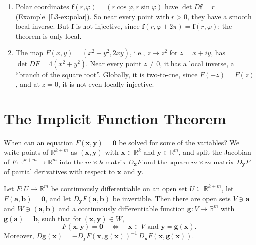 \begin{example}\label{A-ex:local-inverse}
    \begin{enumerate}
        \item Polar coordinates $\mathbf{f}(r, \varphi) = (r\cos\varphi, r\sin\varphi)$ have $\det D\mathbf{f} = r$ (Example~\ref{L3-ex:polar}). So near every point with $r > 0$, they have a smooth local inverse. But $\mathbf{f}$ is not injective, since $\mathbf{f}(r, \varphi + 2\pi) = \mathbf{f}(r, \varphi)$: the theorem is only local.
        \item The map $F(x, y) = (x^2 - y^2, 2xy)$, i.e., $z \mapsto z^2$ for $z = x + iy$, has $\det DF = 4(x^2 + y^2)$. Near every point $z \neq 0$, it has a local inverse, a ``branch of the square root''. Globally, it is two-to-one, since $F(-z) = F(z)$, and at $z = 0$, it is not even locally injective.
    \end{enumerate}
\end{example}

\section{The Implicit Function Theorem}\label{A-sec:implicit}

When can an equation $F(\mathbf{x}, \mathbf{y}) = \mathbf{0}$ be solved for some of the variables? We write points of $\mathbb{R}^{k + m}$ as $(\mathbf{x}, \mathbf{y})$ with $\mathbf{x} \in \mathbb{R}^k$ and $\mathbf{y} \in \mathbb{R}^m$, and split the Jacobian of $F: \mathbb{R}^{k+m} \to \mathbb{R}^m$ into the $m \times k$ matrix $D_{\mathbf{x}}F$ and the square $m \times m$ matrix $D_{\mathbf{y}}F$ of partial derivatives with respect to $\mathbf{x}$ and $\mathbf{y}$.

\begin{theorem}\label{A-thm:implicit-function}
    Let $F: U \to \mathbb{R}^m$ be continuously differentiable on an open set $U \subseteq \mathbb{R}^{k+m}$, let $F(\mathbf{a}, \mathbf{b}) = \mathbf{0}$, and let $D_{\mathbf{y}}F(\mathbf{a}, \mathbf{b})$ be invertible. Then there are open sets $V \ni \mathbf{a}$ and $W \ni (\mathbf{a}, \mathbf{b})$ and a continuously differentiable function $\mathbf{g}: V \to \mathbb{R}^m$ with $\mathbf{g}(\mathbf{a}) = \mathbf{b}$, such that for $(\mathbf{x}, \mathbf{y}) \in W$,
    \[F(\mathbf{x}, \mathbf{y}) = \mathbf{0} \quad \Longleftrightarrow \quad \mathbf{x} \in V \text{ and } \mathbf{y} = \mathbf{g}(\mathbf{x}).\]
    Moreover, $D\mathbf{g}(\mathbf{x}) = -D_{\mathbf{y}}F(\mathbf{x}, \mathbf{g}(\mathbf{x}))^{-1}\,D_{\mathbf{x}}F(\mathbf{x}, \mathbf{g}(\mathbf{x}))$.
\end{theorem}

